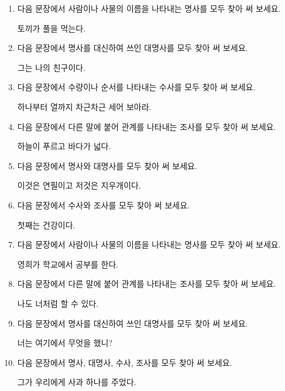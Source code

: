 \documentclass[fs9,seriesFre]{korfarm-base}
\begin{document}
\kfActivityBg {}
\par{}\par\nopagebreak[4]\smallskip\nopagebreak[4]
\begin{enumerate}[leftmargin=22pt, itemsep=6pt, topsep=4pt, label=\textbf{\arabic*.}]
\item 다음 문장에서 사람이나 사물의 이름을 나타내는 명사를 모두 찾아 써 보세요.
\begin{kfEvidence}토끼가 풀을 먹는다.\end{kfEvidence}
\item 다음 문장에서 명사를 대신하여 쓰인 대명사를 모두 찾아 써 보세요.
\begin{kfEvidence}그는 나의 친구이다.\end{kfEvidence}
\item 다음 문장에서 수량이나 순서를 나타내는 수사를 모두 찾아 써 보세요.
\begin{kfEvidence}하나부터 열까지 차근차근 세어 보아라.\end{kfEvidence}
\item 다음 문장에서 다른 말에 붙어 관계를 나타내는 조사를 모두 찾아 써 보세요.
\begin{kfEvidence}하늘이 푸르고 바다가 넓다.\end{kfEvidence}
\item 다음 문장에서 명사와 대명사를 모두 찾아 써 보세요.
\begin{kfEvidence}이것은 연필이고 저것은 지우개이다.\end{kfEvidence}
\item 다음 문장에서 수사와 조사를 모두 찾아 써 보세요.
\begin{kfEvidence}첫째는 건강이다.\end{kfEvidence}
\item 다음 문장에서 사람이나 사물의 이름을 나타내는 명사를 모두 찾아 써 보세요.
\begin{kfEvidence}영희가 학교에서 공부를 한다.\end{kfEvidence}
\item 다음 문장에서 다른 말에 붙어 관계를 나타내는 조사를 모두 찾아 써 보세요.
\begin{kfEvidence}나도 너처럼 할 수 있다.\end{kfEvidence}
\item 다음 문장에서 명사를 대신하여 쓰인 대명사를 모두 찾아 써 보세요.
\begin{kfEvidence}너는 여기에서 무엇을 했니?\end{kfEvidence}
\item 다음 문장에서 명사, 대명사, 수사, 조사를 모두 찾아 써 보세요.
\begin{kfEvidence}그가 우리에게 사과 하나를 주었다.\end{kfEvidence}
\end{enumerate}
\end{document}
